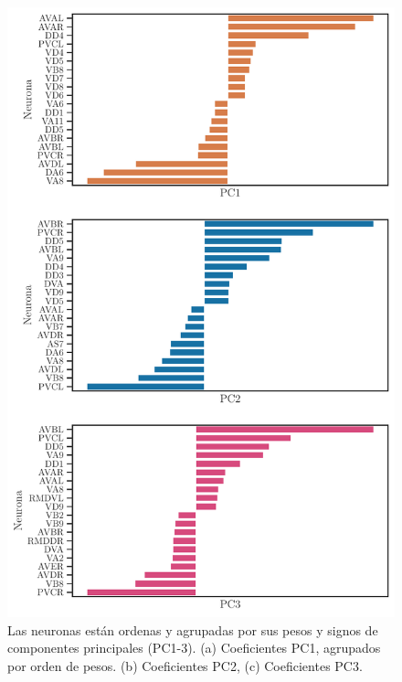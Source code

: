  
 \begin{figure}[h!]
 	\centering\includegraphics[width=\imsize]{PCs_robot.pdf}
 	\caption[Las neuronas están ordenas y agrupadas por sus pesos y signos de componentes principales (PC1-3).]{Las neuronas están ordenas y agrupadas por sus pesos y signos de componentes principales (PC1-3). (a) Coeficientes PC1, agrupados por orden de pesos. (b) Coeficientes PC2, (c) Coeficientes PC3.}\label{fig:pcs}
 \end{figure}


